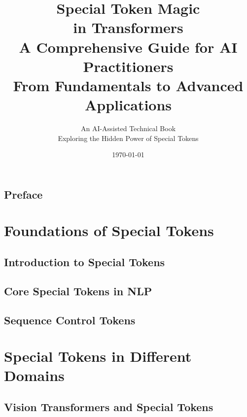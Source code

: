 \documentclass[11pt,oneside]{book}
\title{{\Huge \textbf{Special Token Magic\\in Transformers}}\\[0.5cm]
{\Large A Comprehensive Guide for AI Practitioners}\\[1cm]
{\large From Fundamentals to Advanced Applications}}
\author{{\Large An AI-Assisted Technical Book}\\[0.5cm]
{\normalsize Exploring the Hidden Power of Special Tokens}}
\date{\today}
\theoremstyle{definition}
\theoremstyle{plain}
\theoremstyle{remark}
\begin{document}
\frontmatter
\maketitle

\tableofcontents

\chapter{Preface}


\mainmatter

\part{Foundations of Special Tokens}

\chapter{Introduction to Special Tokens}






\chapter{Core Special Tokens in NLP}





\chapter{Sequence Control Tokens}





\part{Special Tokens in Different Domains}

\chapter{Vision Transformers and Special Tokens}





\end{document}
